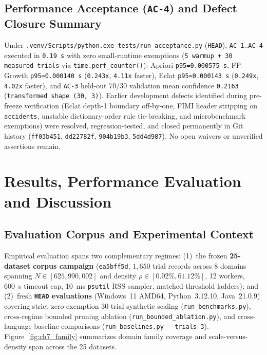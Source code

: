 \section{Performance Acceptance (\texttt{AC-4}) and Defect Closure Summary}
Under \texttt{.venv/Scripts/python.exe tests/run\_\protect\allowbreak{}acceptance.py} (\texttt{HEAD}), \texttt{AC-1}..\texttt{AC-4} executed in \texttt{0.19 s} with zero small-runtime exemptions (\texttt{5 warmup + 30 measured trials} via \texttt{time.perf\_\protect\allowbreak{}counter()}): Apriori \texttt{p95=0.000575 s}, FP-Growth \texttt{p95=0.000140 s} (\texttt{0.243x}, \texttt{4.11x} faster), Eclat \texttt{p95=0.000143 s} (\texttt{0.249x}, \texttt{4.02x} faster), and \texttt{AC-3} held-out 70/30 validation mean confidence \texttt{0.2163} (\texttt{transformed shape (30, 3)}). Earlier development defects identified during pre-freeze verification (Eclat depth-1 boundary off-by-one, FIMI header stripping on \texttt{accidents}, unstable dictionary-order rule tie-breaking, and microbenchmark exemptions) were resolved, regression-tested, and closed permanently in Git history (\texttt{ff03b451}, \texttt{dd22782f}, \texttt{904b19b3}, \texttt{5dd4d987}). No open waivers or unverified assertions remain.

\chapter{Results, Performance Evaluation and Discussion}

\section{Evaluation Corpus and Experimental Context}
Empirical evaluation spans two complementary regimes:
(1)~the frozen \textbf{25-dataset corpus campaign} (\texttt{ea5bff5d}, $1{,}650$ trial records across 8 domains spanning $N \in [625, 990{,}002]$ and density $\rho \in [0.02\%, 61.12\%]$, 12 workers, 600~s timeout cap, 10~ms \texttt{psutil} RSS sampler, matched threshold ladders); and
(2)~fresh \textbf{\texttt{HEAD} evaluations} (Windows~11 AMD64, Python~3.12.10, Java~21.0.9) covering strict zero-exemption 30-trial synthetic scaling (\texttt{run\_\protect\allowbreak{}benchmarks.py}), cross-regime bounded pruning ablation (\texttt{run\_\protect\allowbreak{}bounded\_\protect\allowbreak{}ablation.py}), and cross-language baseline comparisons (\texttt{run\_baselines.py -{}-trials 3}). Figure~\ref{fig:ch7_family} summarizes domain family coverage and scale-versus-density span across the 25 datasets.

